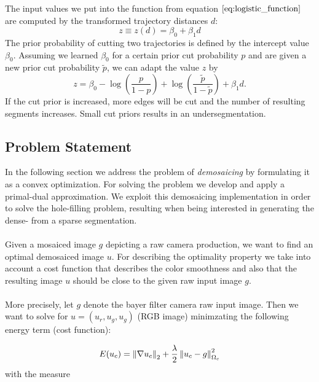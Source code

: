 The input values we put into the function from equation $\ref{eq:logistic_function}$ are computed by the transformed trajectory distances $d$:
\begin{equation}
	z \equiv z(d) = \beta_0 + \beta_1 d
\end{equation}
The prior probability of cutting two trajectories is defined by the intercept value $\beta_0$. Assuming we learned $\beta_0$ for a certain prior cut probability $p$ and are given a new prior cut probability $\tilde{p}$, we can adapt the value $z$ by
\begin{equation}
	z = \beta_0 - \log \left( \frac{p}{1-p} \right) + \log \left( \frac{\tilde{p}}{1-\tilde{p}} \right) + \beta_1 d.
\end{equation}
If the cut prior is increased, more edges will be cut and the number of resulting segments increases. Small cut priors results in an undersegmentation.

\subsection{Problem Statement}
In the following section we address the problem of \emph{demosaicing} by formulating it as a convex optimization. For solving the problem we develop and apply a primal-dual approximation. We exploit this demosaicing implementation in order to solve the hole-filling problem, resulting when being interested in generating the dense- from a sparse segmentation. \\ \\
Given a mosaiced image $g$ depicting a raw camera production, we want to find an optimal demosaiced image $u$. For describing the optimality property we take into account a cost function that describes the color smoothness and also that the resulting image $u$ should be close to the given raw input image $g$. \\ \\
More precisely, let $g$ denote the bayer filter camera raw input image. Then we want to solve for $u=(u_r, u_g, u_g)$ (RGB image) minimzating the following energy term (cost function):

\begin{align}
	E(u_c) = \left\lVert\nabla u_c\right\rVert_2 + \frac{\lambda}{2} \left\lVert u_c - g\right\rVert^2_{\Omega_{c}}
\label{eq:basis_cost_demosaicing}	
\end{align}
with the measure

